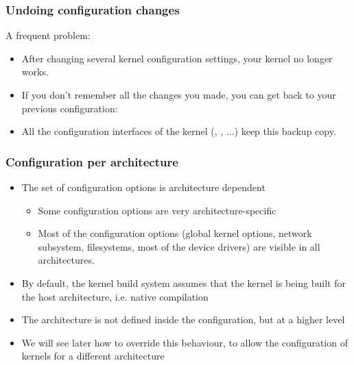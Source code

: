 \begin{frame}
  \frametitle{Undoing configuration changes}
  A frequent problem:
  \begin{itemize}
  \item After changing several kernel configuration settings, your
    kernel no longer works.
  \item If you don't remember all the changes you made,
    you can get back to your previous configuration:\\
  \item All the configuration interfaces of the kernel
    (, , ...) keep
    this  backup copy.
  \end{itemize}
\end{frame}

\begin{frame}
  \frametitle{Configuration per architecture}
  \begin{itemize}
  \item The set of configuration options is architecture dependent
    \begin{itemize}
    \item Some configuration options are very architecture-specific
    \item Most of the configuration options (global kernel options,
      network subsystem, filesystems, most of the device drivers) are
      visible in all architectures.
    \end{itemize}
  \item By default, the kernel build system assumes that the kernel is
    being built for the host architecture, i.e. native compilation
  \item The architecture is not defined inside the configuration, but
    at a higher level
  \item We will see later how to override this behaviour, to allow the
    configuration of kernels for a different architecture
  \end{itemize}
\end{frame}

